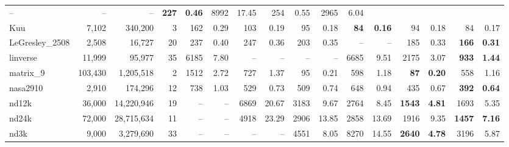 \begin{landscape}
\begin{table}[p]
\begin{tabular}{lrrr||rr|rr|rr|rr|rr|rr}
          --   &       --  &       --   & \textbf{     227} & \textbf{    
          0.46}  &     8992 &    17.45  &      254 &     0.55  &     2965 &     
          6.04\\
                   Kuu  &  7,102  &  340,200  &  3  &      162 &     0.29  
                   &      103 &     0.19  &       95 &     0.18  & 
                   \textbf{      84} & \textbf{    0.16}  &       94 &     
                   0.18  &       84 &     0.17\\
        LeGresley\_2508  &  2,508  &  16,727  &  20  &      237 &     0.40  
        &      247 &     0.36  &      203 &     0.35  &       --  &       --   
        &      185 &     0.33  & \textbf{     166} & \textbf{    0.31}\\
              linverse  &  11,999  &  95,977  &  35  &     6185 &     7.80  
              &       --  &       --   &       --  &       --   &     6685 
              &     9.51  &     2175 &     3.07  & \textbf{     933} & 
              \textbf{    1.44}\\
              matrix\_9  &  103,430  &  1,205,518  &  2  &     1512 &     2.72  
              &      727 &     1.37  &       95 &     0.21  &      598 &     
              1.18  & \textbf{      87} & \textbf{    0.20}  &      558 &     
              1.16\\
              nasa2910  &  2,910  &  174,296  &  12  &      738 &     1.03  
              &      529 &     0.73  &      509 &     0.74  &      648 &     
              0.94  &      435 &     0.67  & \textbf{     392} & \textbf{    
              0.64}\\
                 nd12k  &  36,000  &  14,220,946  &  19  &       --  &       
                 --   &     6869 &    20.67  &     3183 &     9.67  &     2764 
                 &     8.45  & \textbf{    1543} & \textbf{    4.81}  &     
                 1693 &     5.35\\
                 nd24k  &  72,000  &  28,715,634  &  11  &       --  &       
                 --   &     4918 &    23.29  &     2906 &    13.85  &     2858 
                 &    13.69  &     1916 &     9.35  & \textbf{    1457} & 
                 \textbf{    7.16}\\
                  nd3k  &  9,000  &  3,279,690  &  33  &       --  &       --   
                  &       --  &       --   &     4551 &     8.05  &     8270 
                  &    14.55  & \textbf{    2640} & \textbf{    4.78}  &     
                  3196 &     5.87\\

\end{tabular}
\end{table}
\end{landscape}
